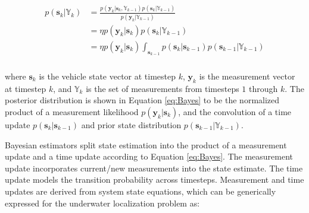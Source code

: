 \begin{align}
\begin{split}
p(\textbf{s}_k|\mathbb{Y}_k) &= \frac{p(\mathbf{y}_k | \textbf{s}_k, \mathbb{Y}_{k-1})p(\textbf{s}_k | \mathbb{Y}_{k-1})}{p(\mathbf{y}_k | \mathbb{Y}_{k-1})} \\
&= \eta p(\mathbf{y}_k | \textbf{s}_k)p(\textbf{s}_k | \mathbb{Y}_{k-1}) \\
&= \eta p(\mathbf{y}_k | \textbf{s}_k) \int_{\textbf{s}_{k-1}} p(\textbf{s}_k | \textbf{s}_{k-1})p(\textbf{s}_{k-1}|\mathbb{Y}_{k-1}) \\
\end{split}
\label{eq:Bayes}
\end{align}

\noindent where $\mathbf{s}_k$ is the vehicle state vector at timestep $k$, $\mathbf{y}_k$ is the measurement vector at timestep $k$, and $\mathbb{Y}_k$ is the set of measurements from timesteps $1$ through $k$.  The posterior distribution is shown in Equation \ref{eq:Bayes} to be the normalized product of a measurement likelihood $p(\mathbf{y}_k | \mathbf{s}_k)$, and the convolution of a time update $p(\mathbf{s}_k | \mathbf{s}_{k-1})$ and prior state distribution $p(\mathbf{s}_{k-1} | \mathbb{Y}_{k-1})$.

%

Bayesian estimators split state estimation into the product of a measurement update and a time update according to Equation \ref{eq:Bayes}.
The measurement update incorporates current/new measurements into the state estimate.
The time update models the transition probability across timesteps.
Measurement and time updates are derived from system state equations, which can be generically expressed for the underwater localization problem as:


